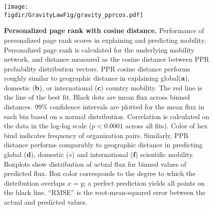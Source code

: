 \documentclass[12pt]{article} %
\def\figdir{../Figs}
\begin{document}
%
%
\begin{figure}[p!]
	\centering
	\texttt{[image: \\figdir/GravityLawFig/gravity\_pprcos.pdf]}
	\caption{
		\textbf{Personalized page rank with cosine distance.}
		Performance of personalized page rank scores in explaining and predicting mobility.
		Personalized page rank is calculated for the underlying mobility network, and distance measured as the cosine distance between PPR probability distribution vectors.
		PPR cosine distance performs roughly similar to geographic distance in explaining global(\textbf{a}), domestic (\textbf{b}), or international (\textbf{c}) country mobility.
		The red line is the line of the best fit.
		Black dots are mean flux across binned distances.
		99\% confidence intervals are plotted for the mean flux in each bin based on a normal distribution. 
		Correlation is calculated on the data in the log-log scale ($p < 0.0001$ across all fits).
		Color of hex bind indicates frequency of organization pairs.
		Similarly, PPR distance performs comparably to geographic distance in predicting global (\textbf{d}), domestic (\textit{e}) and international (\textbf{f}) scientific mobility.
		Boxplots show distribution of actual flux for binned values of predicted flux.
		Box color corresponds to the degree to which the distribution overlaps $x = y$;
		a perfect prediction yields all points on the black line.
		``RMSE'' is the root-mean-squared error between the actual and predicted values.
	}
	\label{fig:supp:gravity_pprcos}
\end{figure}


%
%
\end{document}
